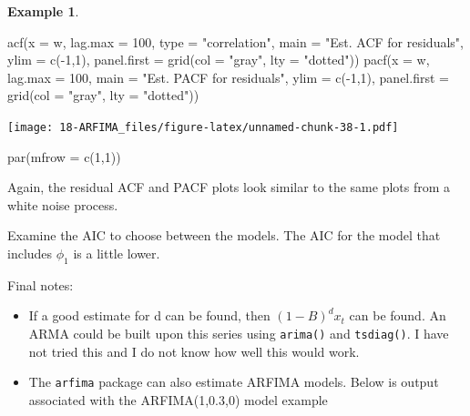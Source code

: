 \documentclass[
]{book}
\newenvironment{Shaded}{\begin{snugshade}}{\end{snugshade}}
\newcommand{\AttributeTok}[1]{\textcolor[rgb]{0.77,0.63,0.00}{#1}}
\newcommand{\DecValTok}[1]{\textcolor[rgb]{0.00,0.00,0.81}{#1}}
\newcommand{\FunctionTok}[1]{\textcolor[rgb]{0.00,0.00,0.00}{#1}}
\newcommand{\NormalTok}[1]{#1}
\newcommand{\OtherTok}[1]{\textcolor[rgb]{0.56,0.35,0.01}{#1}}
\newcommand{\SpecialCharTok}[1]{\textcolor[rgb]{0.00,0.00,0.00}{#1}}
\newcommand{\StringTok}[1]{\textcolor[rgb]{0.31,0.60,0.02}{#1}}
\providecommand{\tightlist}{%
  \setlength{\itemsep}{0pt}\setlength{\parskip}{0pt}}
\theoremstyle{definition}
\theoremstyle{definition}
\newtheorem{example}{Example}[chapter]
\theoremstyle{definition}
\theoremstyle{definition}
\theoremstyle{remark}
\begin{document}
\begin{example}
\begin{Shaded}
\begin{Highlighting}[]
\FunctionTok{acf}\NormalTok{(}\AttributeTok{x =}\NormalTok{ w, }\AttributeTok{lag.max =} \DecValTok{100}\NormalTok{, }\AttributeTok{type =} \StringTok{"correlation"}\NormalTok{, }\AttributeTok{main =} 
   \StringTok{"Est. ACF for residuals"}\NormalTok{, }\AttributeTok{ylim =} \FunctionTok{c}\NormalTok{(}\SpecialCharTok{{-}}\DecValTok{1}\NormalTok{,}\DecValTok{1}\NormalTok{), }\AttributeTok{panel.first =} 
   \FunctionTok{grid}\NormalTok{(}\AttributeTok{col =} \StringTok{"gray"}\NormalTok{, }\AttributeTok{lty =} \StringTok{"dotted"}\NormalTok{))}
\FunctionTok{pacf}\NormalTok{(}\AttributeTok{x =}\NormalTok{ w, }\AttributeTok{lag.max =} \DecValTok{100}\NormalTok{, }\AttributeTok{main =} \StringTok{"Est. PACF for }
\StringTok{    residuals"}\NormalTok{, }\AttributeTok{ylim =} \FunctionTok{c}\NormalTok{(}\SpecialCharTok{{-}}\DecValTok{1}\NormalTok{,}\DecValTok{1}\NormalTok{), }\AttributeTok{panel.first =} \FunctionTok{grid}\NormalTok{(col }
    \OtherTok{=} \StringTok{"gray"}\NormalTok{, }\AttributeTok{lty =} \StringTok{"dotted"}\NormalTok{))}
\end{Highlighting}
\end{Shaded}

\texttt{[image: 18-ARFIMA\_files/figure-latex/unnamed-chunk-38-1.pdf]}

\begin{Shaded}
\begin{Highlighting}[]
\FunctionTok{par}\NormalTok{(}\AttributeTok{mfrow =} \FunctionTok{c}\NormalTok{(}\DecValTok{1}\NormalTok{,}\DecValTok{1}\NormalTok{))}
\end{Highlighting}
\end{Shaded}

Again, the residual ACF and PACF plots look similar to the same plots from a white noise process.

Examine the AIC to choose between the models. The AIC for the model that includes \(\phi_1\) is a little lower.
\end{example}

Final notes:

\begin{itemize}
\tightlist
\item
  If a good estimate for d can be found, then \((1-B)^dx_t\) can be found. An ARMA could be built upon this series using \texttt{arima()} and \texttt{tsdiag()}. I have not tried this and I do not know how well this would work.\\
\item
  The \texttt{arfima} package can also estimate ARFIMA models. Below is output associated with the ARFIMA(1,0.3,0) model example
\end{itemize}
\end{document}
